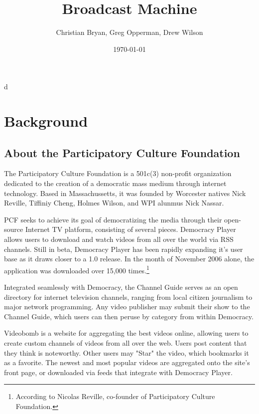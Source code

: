 d\documentclass[a4paper,12pt]{report}
\author{Christian Bryan, Greg Opperman, Drew Wilson}
\date{\today}
\title{Broadcast Machine}
\begin{document}
\maketitle

\tableofcontents

\chapter{Background}


\section{About the Participatory Culture Foundation}
	The Participatory Culture Foundation is a 501c(3) non-profit organization dedicated to the creation of a democratic mass medium through internet technology. 
Based in Massachussetts, it was founded by Worcester natives Nick Reville, Tiffiniy Cheng, Holmes Wilson, and WPI alunmus Nick Nassar.

	PCF seeks to achieve its goal of democratizing the media through their open-source Internet TV platform, consisting of several pieces.  Democracy Player allows users to download and watch videos from all over the world via RSS channels. 
Still in beta, Democracy Player has been rapidly expanding it's user base as it draws closer to a 1.0 release. 
In the month of November 2006 alone, the application was downloaded over 15,000 times.\footnote{According to Nicolas Reville, co-founder of Participatory Culture Foundation.}

Integrated seamlessly with Democracy, the Channel Guide serves as an open directory for internet television channels, ranging from local citizen journalism to major network programming. 
Any video publisher may submit their show to the Channel Guide, which users can then peruse by category from within Democracy.

Videobomb is a website for aggregating the best videos online, allowing users to create custom channels of videos from all over the web. 
Users post content that they think is noteworthy. 
Other users may "Star" the video, which bookmarks it as a favorite. 
The newest and most popular videos are aggregated onto the site's front page, or downloaded via feeds that integrate with Democracy Player.
\end{document}
